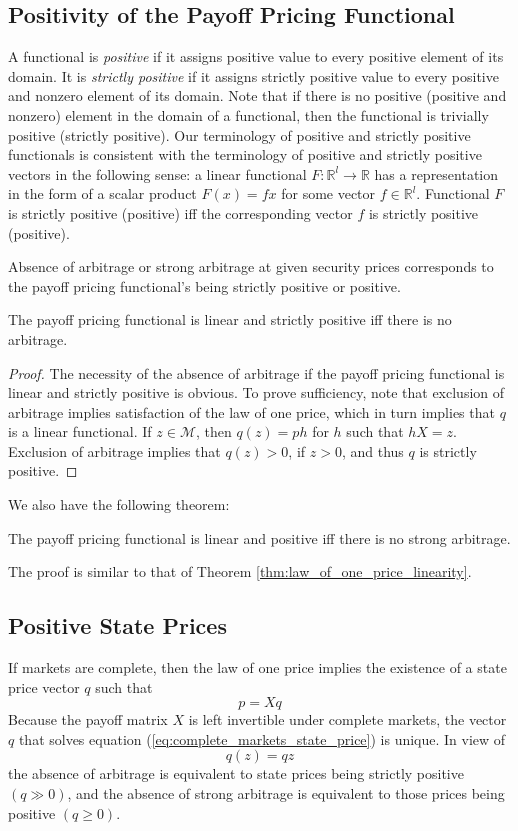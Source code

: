 \documentclass[\topdir/lecture\_notes.tex]{subfiles}
\begin{document}
\subsection{Positivity of the Payoff Pricing Functional}
A functional is \emph{positive} if it assigns positive value to every positive element of its domain. It is \emph{strictly positive} if it assigns strictly positive value to every positive and nonzero element of its domain. Note that if there is no positive (positive and nonzero) element in the domain of a functional, then the functional is trivially positive (strictly positive). Our terminology of positive and strictly positive functionals is consistent with the terminology of positive and strictly positive vectors in the following sense: a linear functional $F: \mathbb{R}^{l} \rightarrow \mathbb{R}$ has a representation in the form of a scalar product $F(x)=f x$ for some vector $f \in \mathbb{R}^{l}$. Functional $F$ is strictly positive (positive) iff the corresponding vector $f$ is strictly positive (positive).

Absence of arbitrage or strong arbitrage at given security prices corresponds to the payoff pricing functional's being strictly positive or positive.

\begin{theorem}
\label{thm:linear}
The payoff pricing functional is linear and strictly positive iff there is no arbitrage.
\end{theorem}
\begin{proof}
The necessity of the absence of arbitrage if the payoff pricing functional is linear and strictly positive is obvious. To prove sufficiency, note that exclusion of arbitrage implies satisfaction of the law of one price, which in turn implies that $q$ is a linear functional. If $z \in \mathcal{M}$, then $q(z)=p h$ for $h$ such that $h X=z$. Exclusion of arbitrage implies that $q(z)>0$, if $z>0$, and thus $q$ is strictly positive.
\end{proof}
We also have the following theorem:
\begin{theorem}
\label{thm:positive}
The payoff pricing functional is linear and positive iff there is no strong arbitrage.
\end{theorem}
The proof is similar to that of Theorem \ref{thm:law_of_one_price_linearity}.

\subsection{Positive State Prices}
If markets are complete, then the law of one price implies the existence of a state price vector $q$ such that
\begin{equation}
p=X q \label{eq:complete_markets_state_price}
\end{equation}
Because the payoff matrix $X$ is left invertible under complete markets, the vector $q$ that solves equation (\ref{eq:complete_markets_state_price}) is unique. In view of
\begin{equation*}
q(z)=q z 
\end{equation*}
the absence of arbitrage is equivalent to state prices being strictly positive $(q \gg 0)$, and the absence of strong arbitrage is equivalent to those prices being positive $(q \geq 0)$.
\end{document}
